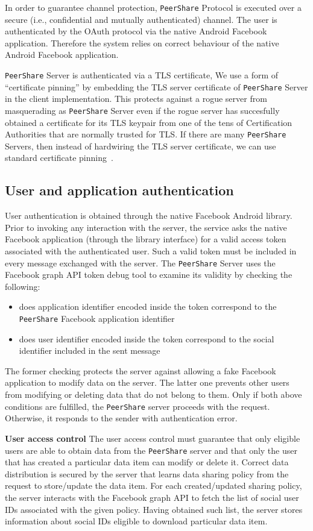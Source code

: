 \documentclass[twocolumn,a4paper,10pt]{article}
\newcommand{\peershare}{\texttt{PeerShare}\xspace}
\begin{document}
In order to guarantee channel protection, \peershare Protocol is
executed over a secure (i.e., confidential and mutually authenticated)
channel.  The user is authenticated by the OAuth protocol via the
native Android Facebook application. Therefore the system relies on
correct behaviour of the native Android Facebook application.

\peershare Server is authenticated via a TLS certificate, 
We use a form of ``certificate pinning'' by embedding the TLS server
certificate of \peershare Server in the client implementation.  This
protects against a rogue server from masquerading as \peershare Server
even if the rogue server has succesfully obtained a certificate for
its TLS keypair from one of the tens of Certification Authorities that
are normally trusted for TLS.  If there are many \peershare Servers,
then instead of hardwiring the TLS server certificate, we can use
standard certificate pinning~\cite{draft.pinning}.

\subsection{User and application authentication}
User authentication is obtained through the native Facebook Android library. Prior to invoking any interaction with the server, the service asks the native Facebook application (through the library interface) for a valid access token associated with the authenticated user. Such a valid token must be included in every message exchanged with the server. The \peershare Server uses the Facebook graph API token debug tool to examine its validity by checking the following:
\begin{itemize}
\item does application identifier encoded inside the token correspond to the \peershare Facebook application identifier
\item does user identifier encoded inside the token correspond to the social identifier included in the sent message
\end{itemize}
The former checking protects the server against allowing a fake Facebook application to modify data on the server. The latter one prevents other users from modifying or deleting data that do not belong to them. Only if both above conditions are fulfilled, the \peershare server proceeds with the request. Otherwise, it responds to the sender with authentication error.

\textbf{User access control}
The user access control must guarantee that only eligible users are able to obtain data from the \peershare server and that only the user that has created a particular data item can modify or delete it. Correct data distribution is secured by the server that learns data sharing policy from the request to store/update the data item. For each created/updated sharing policy, the server interacts with the Facebook graph API to fetch the list of social user IDs associated with the given policy. Having obtained such list, the server stores information about social IDs eligible to download particular data item. 
\end{document}
